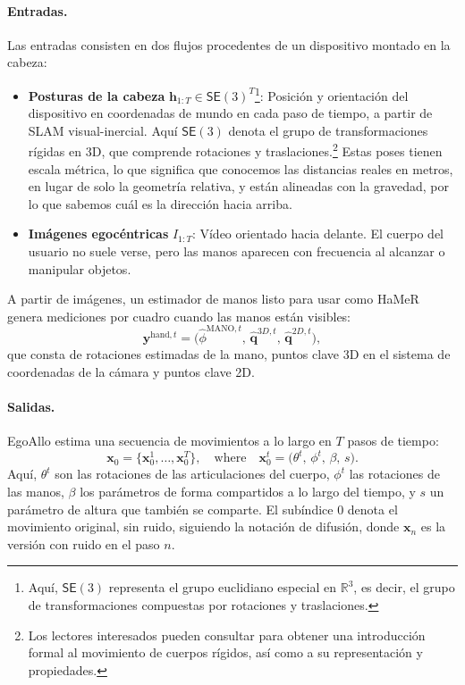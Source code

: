 \documentclass[../../book-main_es.tex]{subfiles}
\begin{document}
\paragraph{Entradas.}
Las entradas consisten en dos flujos procedentes de un dispositivo montado en la cabeza:
\begin{itemize}
    \item \textbf{Posturas de la cabeza} $\boldsymbol{h}_{1:T} \in \mathsf{SE}(3)^T$\footnote{Aquí, 
            $\mathsf{SE}(3)$ representa el grupo euclidiano especial en $\mathbb{R}^3$, es decir, el 
        grupo de transformaciones compuestas por rotaciones y traslaciones.}:
        Posición y orientación del dispositivo en coordenadas de mundo
        en cada paso de tiempo, a partir de SLAM visual-inercial. Aquí $\mathsf{SE}(3)$
        denota el grupo de transformaciones rígidas en 3D, que comprende
        rotaciones y traslaciones.\footnote{Los lectores interesados pueden
            consultar \cite{MaY2003} para obtener una introducción formal al movimiento de
        cuerpos rígidos, así como a su representación y propiedades.} Estas
        poses tienen escala métrica, lo que significa que conocemos las distancias reales en
        metros, en lugar de solo la geometría relativa, y están
        alineadas con la gravedad, por lo que sabemos cuál es la dirección hacia arriba.
    \item \textbf{Imágenes egocéntricas} $I_{1:T}$: Vídeo orientado hacia delante.
        El cuerpo del usuario no suele verse, pero las manos aparecen con frecuencia
        al alcanzar o manipular objetos.
\end{itemize}

A partir de imágenes, un estimador de manos listo para usar como HaMeR
\citep{pavlakos2023hamer} genera mediciones por cuadro cuando las manos
están visibles:
\begin{equation}
    \boldsymbol{y}^{\text{hand},t} = \big(\hat{\phi}^{\text{MANO},t},\,
    \hat{\boldsymbol{q}}^{3D,t},\, \hat{\boldsymbol{q}}^{2D,t}\big),
\end{equation}
que consta de rotaciones estimadas de la mano, puntos clave 3D en el sistema de coordenadas de la cámara
y puntos clave 2D.

\paragraph{Salidas.}
EgoAllo estima una secuencia de movimientos a lo largo en $T$ pasos de tiempo:
\begin{equation}
    \boldsymbol{x}_0 = \{\boldsymbol{x}_0^{1}, \dots, \boldsymbol{x}_0^{T}\},
    \quad\text{where}\quad
    \boldsymbol{x}_0^{t} = \big(\theta^t,\, \phi^t,\, \beta,\, s\big).
\end{equation}
Aquí, $\theta^t$ son las rotaciones de las articulaciones del cuerpo, $\phi^t$ las rotaciones de las manos,
$\beta$ los parámetros de forma compartidos a lo largo del tiempo, y $s$ un parámetro de altura
que también se comparte. El subíndice $0$ denota el movimiento original, sin ruido,
siguiendo la notación de difusión, donde $\boldsymbol{x}_n$ es la versión con ruido
en el paso $n$.
\end{document}
